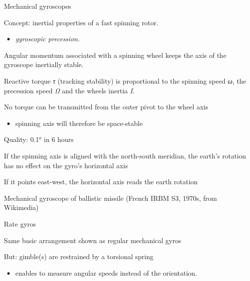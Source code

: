 \documentclass[compress]{beamer}
\begin{document}
\begin{frame}{Mechanical gyroscopes}

Concept: inertial properties of a fast spinning rotor.

\begin{itemize}

\item
  \emph{gyroscopic precession.}
\end{itemize}

Angular momentum associated with a spinning wheel keeps the axis of the
gyroscope inertially stable.

Reactive torque \emph{τ} (tracking stability) is proportional to the
spinning speed \emph{ω}, the precession speed \emph{Ω} and the wheels
inertia \emph{I}.

No torque can be transmitted from the outer pivot to the wheel axis

\begin{itemize}

\item
  spinning axis will therefore be space-stable
\end{itemize}

Quality: 0.1° in 6 hours

If the spinning axis is aligned with the north-south meridian, the
earth's rotation has no effect on the gyro's horizontal axis

\end{frame}

\begin{frame}{If it points east-west, the horizontal axis reads the
earth rotation}

Mechanical gyroscope of ballistic missile (French IRBM S3, 1970s, from
Wikimedia)

\end{frame}

\begin{frame}{Rate gyros}

Same basic arrangement shown as regular mechanical gyros

But: gimble(s) are restrained by a torsional spring

\begin{itemize}

\item
  enables to measure angular speeds instead of the orientation.
\end{itemize}

\end{frame}
\end{document}
